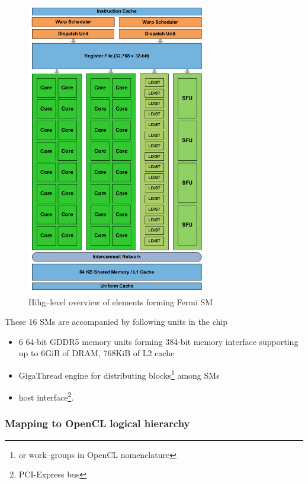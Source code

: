 \begin{figure}[htb]
  \begin{center}
    \includegraphics[width=0.7\textwidth]{chapters/opencl/fermism.png}
  \end{center}
  \caption{Hihg--level overview of elements forming Fermi SM}
  \label{fig:fermism}
\end{figure}

These 16 SMs are accompanied by following units in the chip
\begin{itemize}
  \item 6 64-bit GDDR5 memory units forming 384-bit
memory interface supporting up to 6GiB of DRAM, 768KiB of L2 cache
  \item GigaThread engine for distributing blocks\footnote{or work--groups in OpenCL nomenclature}
  among SMs
  \item host interface\footnote{PCI-Express bus}.
\end{itemize}

\subsubsection{Mapping to OpenCL logical hierarchy}

